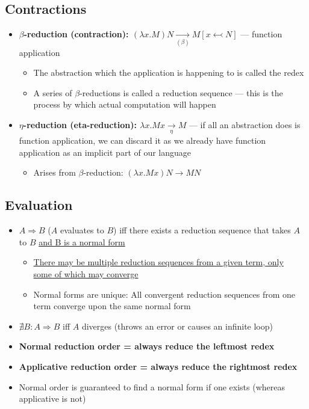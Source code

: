 \documentclass[20pt,a4paper,landscape]{extarticle}
\begin{document}
\begin{flushleft}
\subsection{Contractions}
\begin{itemize}
\item \textbf{$\beta$-reduction (contraction): $(\lambda x. M)N \underset{(\beta)}{\rightarrow} M[x \leftarrowtail N]$} — function application
    \begin{itemize}
    \item The abstraction which the application is happening to is called the redex
    \item A series of $\beta$-reductions is called a reduction sequence — this is the process by which actual computation will happen
    \end{itemize}
\item \textbf{$\eta$-reduction (eta-reduction): $\lambda x. Mx \underset{\eta}{\rightarrow} M$} — if all an abstraction does is function application, we can discard it as we already have function application as an implicit part of our language
    \begin{itemize}
    \item Arises from $\beta$-reduction: $(\lambda x. Mx)N \rightarrow MN$
    \end{itemize}
\end{itemize}
\subsection{Evaluation}
\begin{itemize}
\item $A \Rightarrow B$ ($A$ evaluates to $B$) iff there exists a reduction sequence that takes $A$ to $B$ \underline{and B is a normal form}
    \begin{itemize}
    \item \underline{There may be multiple reduction sequences from a given term, only}\\
    \underline{some of which may converge}
    \item Normal forms are unique: All convergent reduction sequences from one term converge upon the same normal form
    \end{itemize}
\item $\nexists B: A \Rightarrow B$ iff $A$ diverges (throws an error or causes an infinite loop)
\item \textbf{Normal reduction order = always reduce the leftmost redex}
\item \textbf{Applicative reduction order = always reduce the rightmost redex}
\item Normal order is guaranteed to find a normal form if one exists (whereas applicative is not)
\end{itemize}

\end{flushleft}
\end{document}
